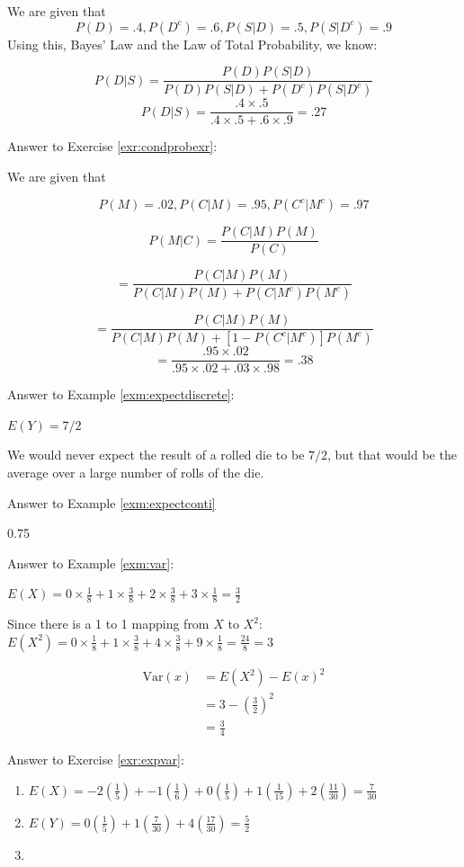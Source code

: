 \documentclass[]{book}
\theoremstyle{definition}
\theoremstyle{definition}
\theoremstyle{definition}
\theoremstyle{remark}
\begin{document}
We are given that \[P(D) = .4, P(D^c) = .6, P(S|D) = .5, P(S|D^c) = .9\]
Using this, Bayes' Law and the Law of Total Probability, we know:

\[P(D|S) = \frac{P(D)P(S|D)}{P(D)P(S|D) + P(D^c)P(S|D^c)}\]
\[P(D|S) = \frac{.4 \times .5}{.4 \times .5 + .6 \times .9 } = .27\]

Answer to Exercise \ref{exr:condprobexr}:

We are given that

\[P(M) = .02, P(C|M) = .95, P(C^c|M^c) = .97\]

\[P(M|C) = \frac{P(C|M)P(M)}{P(C)}\]

\[= \frac{P(C|M)P(M)}{P(C|M)P(M) + P(C|M^c)P(M^c)}\]

\[= \frac{P(C|M)P(M)}{P(C|M)P(M) + [1-P(C^c|M^c)]P(M^c)}\]
\[ = \frac{.95 \times .02}{.95 \times .02 + .03 \times .98} = .38\]

Answer to Example \ref{exm:expectdiscrete}:

\(E(Y)=7/2\)

We would never expect the result of a rolled die to be \(7/2\), but that
would be the average over a large number of rolls of the die.

Answer to Example \ref{exm:expectconti}

0.75

Answer to Example \ref{exm:var}:

\(E(X) = 0 \times \frac{1}{8} + 1 \times \frac{3}{8} + 2 \times \frac{3}{8} + 3 \times \frac{1}{8} = \frac{3}{2}\)

Since there is a 1 to 1 mapping from \(X\) to \(X^2:\)
\(E(X^2) = 0 \times \frac{1}{8} + 1 \times \frac{3}{8} + 4 \times \frac{3}{8} + 9 \times \frac{1}{8} = \frac{24}{8} = 3\)

\begin{align*}
\text{Var}(x) &= E(X^2) - E(x)^2\\
&= 3 - (\frac{3}{2})^2\\
&= \frac{3}{4}
\end{align*}

Answer to Exercise \ref{exr:expvar}:

\begin{enumerate}
\def\labelenumi{\arabic{enumi}.}
\item
  \(E(X) = -2(\frac{1}{5}) + -1(\frac{1}{6}) + 0(\frac{1}{5}) + 1(\frac{1}{15}) + 2(\frac{11}{30}) = \frac{7}{30}\)
\item
  \(E(Y) = 0(\frac{1}{5}) + 1(\frac{7}{30}) + 4(\frac{17}{30}) = \frac{5}{2}\)
\item
\end{enumerate}
\end{document}
